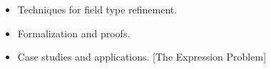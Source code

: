 \documentclass[portrait,final,a0paper,fontscale=0.277]{baposter}
\newcommand{\compresslist}{%
\setlength{\itemsep}{0pt}%
\setlength{\parskip}{0pt}%
\setlength{\parsep}{0pt}%
}
\begin{document}
\begin{poster}
{\begin{multicols}{2}
\begin{itemize}\compresslist
\item Techniques for field type refinement.
\item Formalization and proofs.
\item Case studies and applications.
    \small{\newline
    [The Expression Problem] 
    }
\end{itemize}
\end{multicols}
}

% 



\end{poster}
\end{document}
